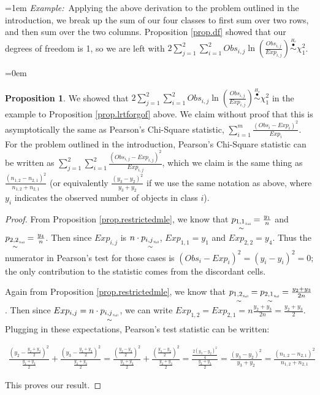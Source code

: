 \documentclass[12pt, letterpaper]{article}
\newenvironment{ex}{
	\par\medskip %
	\leftskip=1em %
	\noindent\textit{Example:}\,
}{
	\par\medskip %
	\leftskip=0em %
}
\theoremstyle{definition}
\newtheorem{prop}{Proposition}[theorem]
\numberwithin{equation}{section}
\newcommand{\+}[1]{+_{\scalebox{.375}{#1}}}
\newcommand{\1}{\mathbbm{1}}
\begin{document}
\begin{ex}\label{ex.specificteststat}
	Applying the above derivation to the problem outlined in the introduction, we break up the sum of our four classes to first sum over two rows, and then sum over the two columns. Proposition \ref{prop.df} showed that our degrees of freedom is 1, so we are left with $2\sum\limits_{j=1}^{2}\sum\limits_{i=1}^{2}Obs_{i,j}\ln\left(\frac{Obs_{i,j}}{Exp_{i,j}}\right) \stackrel{\stackrel{H_o}{\bullet}}{\sim} \chi^2_{1}$. 
\end{ex}


\newpage
{}
\begin{prop}\label{prop.pearsonstat}
	We showed that $2\sum\limits_{j=1}^{2}\sum\limits_{i=1}^{2}Obs_{i,j}\ln\left(\frac{Obs_{i,j}}{Exp_{i,j}}\right) \stackrel{\stackrel{H_o}{\bullet}}{\sim} \chi^2_{1}$ in the example to Proposition \ref{prop.lrtforgof} above. We claim without proof that this is asymptotically the same as Pearson's Chi-Square statistic, $\sum\limits_{i=1}^{m}\frac{(Obs_i-Exp_i)^2}{Exp_i}$. For the problem outlined in the introduction, Pearson's Chi-Square statistic can be written as $\sum\limits_{j=1}^{2}\sum\limits_{i=1}^{2}\frac{(Obs_{i,j}-Exp_{i,j})^2}{Exp_{i,j}}$, which we claim is the same thing as $\frac{(n_{1,2}-n_{2,1})^2}{n_{1,2}+n_{2,1}}$ (or equivalently $\frac{(y_{3}-y_{2})^2}{y_{3}+y_{2}}$ if we use the same notation as above, where $y_i$ indicates the observed number of objects in class $i$).
	
	\begin{proof}
		From Proposition \ref{prop.restrictedmle}, we know that $\underset{\sim}{{p_{1,1}}_{\scalebox{.35}{Null}}}=\frac{y_1}{n}$ and $\underset{\sim}{{p_{2,2}}_{\scalebox{.35}{Null}}}=\frac{y_4}{n}$. Then since $Exp_{i,j}$ is $n \cdot \underset{\sim}{{p_{i,j}}_{\scalebox{.35}{Null}}}$, $Exp_{1,1}=y_1$ and $Exp_{2,2}=y_4$. Thus the numerator in Pearson's test for those cases is $(Obs_i-Exp_i)^2=(y_i-y_i)^2=0$; the only contribution to the statistic comes from the discordant cells.
		\vspace{\baselineskip}
		
		Again from Proposition \ref{prop.restrictedmle}, we know that $\underset{\sim}{{p_{1,2}}_{\scalebox{.35}{Null}}}=\underset{\sim}{{p_{2,1}}_{\scalebox{.35}{Null}}}=\frac{y_2+y_3}{2n}$. Then since $Exp_{i,j}=n \cdot \underset{\sim}{{p_{i,j}}_{\scalebox{.35}{Null}}}$, we can write $Exp_{1,2}=Exp_{2,1}=n \frac{y_2+y_3}{2n}=\frac{y_2+y_3}{2}$. Plugging in these expectations, Pearson's test statistic can be written:
		
		\begin{align*}
			\frac{\left(y_2-\frac{y_2+y_3}{2}\right)^2}{\frac{y_2+y_3}{2}}{+}\frac{\left(y_3-\frac{y_2+y_3}{2}\right)^2}{\frac{y_2+y_3}{2}}=
			\frac{\left(\frac{y_2-y_3}{2}\right)^2}{\frac{y_2+y_3}{2}}{+}\frac{\left(\frac{y_3-y_2}{2}\right)^2}{\frac{y_2+y_3}{2}}=\frac{\frac{2(y_3-y_2)^2}{4}}{\frac{y_2+y_3}{2}}=\frac{(y_3-y_2)^2}{y_3+y_2}=\frac{(n_{1,2}-n_{2,1})^2}{n_{1,2}+n_{2,1}}
		\end{align*}	
	
	This proves our result.			
	\end{proof}
\end{prop}
\end{document}
